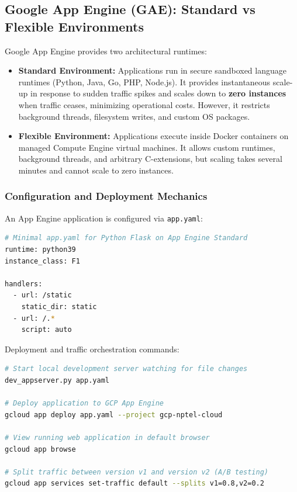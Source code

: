 \subsection{Google App Engine (GAE): Standard vs Flexible Environments}
Google App Engine provides two architectural runtimes:
\begin{itemize}[leftmargin=*]
  \item \textbf{Standard Environment:} Applications run in secure sandboxed language runtimes (Python, Java, Go, PHP, Node.js). It provides instantaneous scale-up in response to sudden traffic spikes and scales down to \textbf{zero instances} when traffic ceases, minimizing operational costs. However, it restricts background threads, filesystem writes, and custom OS packages.
  \item \textbf{Flexible Environment:} Applications execute inside Docker containers on managed Compute Engine virtual machines. It allows custom runtimes, background threads, and arbitrary C-extensions, but scaling takes several minutes and cannot scale to zero instances.
\end{itemize}

\subsubsection{Configuration and Deployment Mechanics}
An App Engine application is configured via \texttt{app.yaml}:
\begin{lstlisting}[language=bash]
# Minimal app.yaml for Python Flask on App Engine Standard
runtime: python39
instance_class: F1

handlers:
  - url: /static
    static_dir: static
  - url: /.*
    script: auto
\end{lstlisting}

Deployment and traffic orchestration commands:
\begin{lstlisting}[language=bash]
# Start local development server watching for file changes
dev_appserver.py app.yaml

# Deploy application to GCP App Engine
gcloud app deploy app.yaml --project gcp-nptel-cloud

# View running web application in default browser
gcloud app browse

# Split traffic between version v1 and version v2 (A/B testing)
gcloud app services set-traffic default --splits v1=0.8,v2=0.2
\end{lstlisting}

